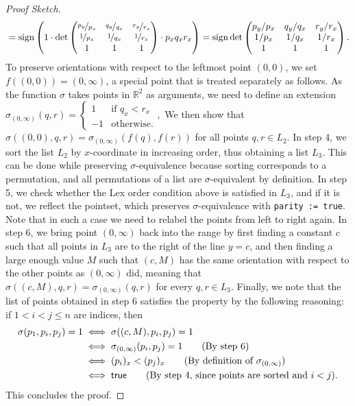 \begin{proof}[Proof Sketch]
\[\begin{multlined}
                        = \sign \left(1 \cdot \det  \begin{pmatrix} \nicefrac{p_y}{p_x} & \nicefrac{q_y}{q_x} & \nicefrac{r_y}{r_x} \\ \nicefrac{1}{p_x} & \nicefrac{1}{q_x} & \nicefrac{1}{r_x} \\ 1 & 1 & 1 \end{pmatrix} \cdot  p_x q_x r_x  \right) = \sign \det \begin{pmatrix} p_y/p_x & q_y/q_x & r_y/r_x \\ 1/p_x & 1/q_x & 1/r_x \\ 1 & 1 & 1 \end{pmatrix}.
\end{multlined}
\]
To preserve orientations with respect to the leftmost point $(0, 0)$, we set $f( (0, 0)) = (0, \infty)$, a special point that is treated separately as follows.
As the function $\sigma$ takes points in $\mathbb{R}^2$ as arguments,
we need to define an extension
\(
  \sigma_{(0, \infty)}(q, r) = \begin{cases}
    1 & \text{if } q_x < r_x \\
    -1 & \text{otherwise}.  
  \end{cases},
\)
We then show that $\sigma((0, 0), q, r) = \sigma_{(0, \infty)}(f(q), f(r))$ for all points $q, r \in L_2$. 
In step 4, we sort the list $L_2$ by $x$-coordinate in increasing order, thus obtaining a list $L_3$.
This can be done while preserving $\sigma$-equivalence because sorting corresponds to a permutation, and all permutations of a list are $\sigma$-equivalent by definition.
In step 5, we check whether the \textsf{Lex order} condition above is satisfied in $L_3$, and if it is not, we reflect the pointset, which preserves $\sigma$-equivalence with \lstinline|parity := true|.
Note that in such a case we need to relabel the points from left to right again.
In step 6, we bring point $(0, \infty)$ back into the range by first finding a constant $c$ such that all points in $L_3$ are to the right of the line $y=c$, and then finding a large enough value $M$ such that $(c, M)$ has the same orientation with respect to the other points as $(0, \infty)$ did, meaning that 
\(\sigma((c, M), q, r) = \sigma_{(0, \infty)}(q, r)\) for every $q, r \in L_3$.
Finally, we note that the list of points obtained in step 6 satisfies the  property by the following reasoning:
if $1 < i < j \leq n$ are indices, then 
\begin{align*}
  \sigma(p_1, p_i, p_j) = 1 &\iff \sigma((c, M), p_i, p_j) = 1\\
                            &\iff \sigma_{(0, \infty)}(p_i, p_j) = 1\tag{By step 6}\\
                            &\iff (p_i)_x < (p_j)_x \tag{By definition of $\sigma_{(0, \infty)}$}\\
                            &\iff \textsf{true} \tag{By step 4, since points are sorted and $i < j$}.
\end{align*}
This concludes the proof.
\end{proof}

